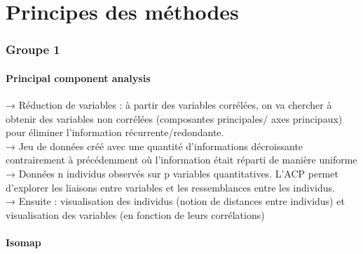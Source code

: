 \documentclass[12pt]{report}
\begin{document}
\part{Principes des méthodes}

\section{Groupe 1}
\subsection{Principal component analysis}
→ Réduction de variables : à partir des variables corrélées, on va chercher à obtenir des variables non corrélées (composantes principales/ axes principaux) pour éliminer l’information récurrente/redondante.\\
→ Jeu de données créé avec une quantité d’informations décroissante contrairement à précédemment où l’information était réparti de manière uniforme\\
→ Données n individus observés sur p variables quantitatives. L’ACP permet d’explorer les liaisons entre variables et les ressemblances entre les individus.\\
→ Ensuite : visualisation des individus (notion de distances entre individus) et visualisation des variables (en fonction de leurs corrélations)\\

\subsection{Isomap}
\end{document}
